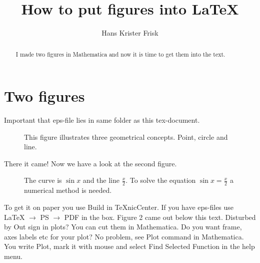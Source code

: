 \documentclass[11pt,a4paper]{article}
\begin{document}
\title{How to put figures into LaTeX}
\author{Hans Krister Frisk}
\maketitle

\begin{abstract}
 I made two figures in Mathematica and now it is time to get
 them into the text.
\end{abstract}



\section{Two figures}

Important that eps-file lies in same folder as this tex-document.
\begin{figure}[tbph]
\caption{ This figure illustrates three geometrical concepts.
Point, circle and line.}
\end{figure}

There it came! Now we have a look at the second figure.
  
\begin{figure}[tbph]
\caption{ The curve is $\sin x$ and the line $\frac{x}{2}$. To solve
the equation $\sin x = \frac{x}{2}$ a numerical method is needed. 
}
\end{figure}
 
To get it on paper you use Build in TeXnicCenter. If you have eps-files
use LaTeX $\rightarrow$ PS $\rightarrow$ PDF in the box. Figure 2 came out below this text.
Disturbed by Out sign in plots? You can cut them in Mathematica. Do you want frame, axes labels etc
for your plot? No problem, see Plot command in Mathematica. You write Plot, mark it with mouse and select
Find Selected Function in the help menu.
\end{document}
